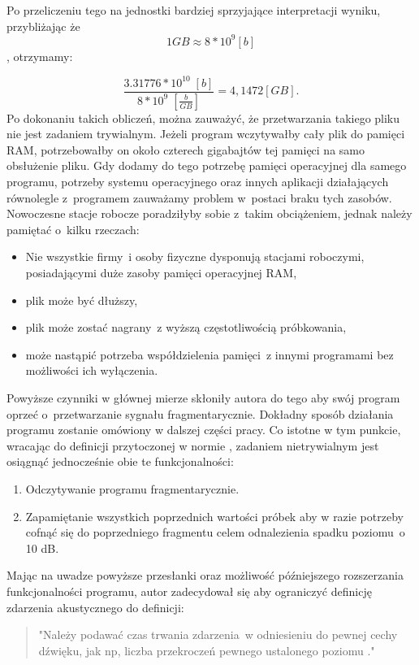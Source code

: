 \documentclass[eng,printmode]{mgr}
\begin{document}
Po przeliczeniu tego na jednostki bardziej sprzyjające interpretacji wyniku, przybliżając że $$1GB \approx 8*10^9 [b]$$, otrzymamy:


\begin{equation}
\frac{3.31776*10^10\;[b]}{8*10^9\;[\frac{b}{GB}]} = 4,1472 [GB].
\end{equation}
Po dokonaniu takich obliczeń, można zauważyć, że przetwarzania takiego pliku nie jest zadaniem trywialnym. Jeżeli program wczytywałby cały plik do pamięci RAM, potrzebowałby on około czterech gigabajtów tej pamięci na samo obsłużenie pliku. Gdy dodamy do tego potrzebę pamięci operacyjnej dla samego programu, potrzeby systemu operacyjnego oraz innych aplikacji działających równolegle z~programem zauważamy problem w~postaci braku tych zasobów. Nowoczesne stacje robocze poradziłyby sobie z~takim obciążeniem, jednak należy pamiętać o~kilku rzeczach:
\begin{itemize}
\item Nie wszystkie firmy~i osoby fizyczne dysponują stacjami roboczymi, posiadającymi duże zasoby pamięci operacyjnej RAM,
\item plik może być dłuższy,
\item plik może zostać nagrany~z wyższą częstotliwością próbkowania,
\item może nastąpić potrzeba współdzielenia pamięci~z innymi programami bez możliwości ich wyłączenia.
\end{itemize}

Powyższe czynniki w głównej mierze skłoniły autora do tego aby swój program oprzeć o~przetwarzanie sygnału fragmentarycznie. Dokładny sposób działania programu zostanie omówiony w dalszej części pracy. Co istotne w tym punkcie, wracając do definicji przytoczonej w normie \cite{PN-ISO-1996-1:2006}, zadaniem nietrywialnym jest osiągnąć jednocześnie obie te funkcjonalności:
\begin{enumerate}
\item Odczytywanie programu fragmentarycznie.
\item Zapamiętanie wszystkich poprzednich wartości próbek aby w razie potrzeby cofnąć się do poprzedniego fragmentu celem odnalezienia spadku poziomu~o 10 dB.
\end{enumerate}

Mając na uwadze powyższe przesłanki oraz możliwość późniejszego rozszerzania funkcjonalności programu, autor zadecydował się aby ograniczyć definicję zdarzenia akustycznego do definicji:

\begin{quote}
"Należy podawać czas trwania zdarzenia~w odniesieniu do pewnej cechy dźwięku, jak np, liczba przekroczeń pewnego ustalonego poziomu \newline \cite{PN-ISO-1996-1:2006}."
\end{quote}
\end{document}
